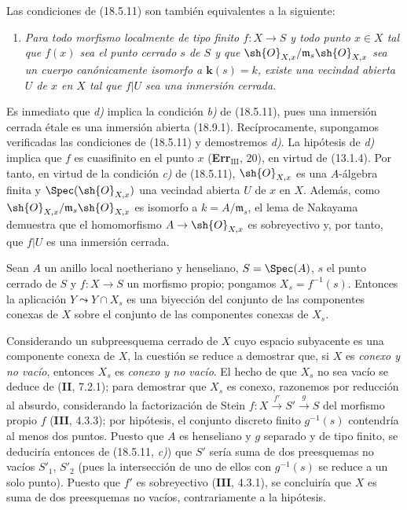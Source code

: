 \begin{remark}[18.5.18]
\label{IV.18.5.18}
Las condiciones de (18.5.11) son también equivalentes a la siguiente:
\begin{enumerate}
  \item[\textup{d)}] \itshape Para todo morfismo localmente de tipo finito $f:X\to S$ y todo punto $x\in X$ tal que $f(x)$ sea el punto cerrado $s$ de $S$ y que $\sh{O}_{X,x}/\mathfrak m_s\sh{O}_{X,x}$ sea un cuerpo canónicamente isomorfo a $\boldsymbol{k}(s)=k$, existe una vecindad abierta $U$ de $x$ en $X$ tal que $f|U$ sea una inmersión cerrada.
\end{enumerate}
\end{remark}


Es inmediato que \emph{d)} implica la condición \emph{b)} de (18.5.11), pues una inmersión cerrada étale es una inmersión abierta (18.9.1). Recíprocamente, supongamos verificadas las condiciones de (18.5.11) y demostremos \emph{d)}. La hipótesis de \emph{d)} implica que $f$ es cuasifinito en el punto $x$ (\textbf{Err}$_{\mathrm{III}}$, 20), en virtud de (13.1.4). Por tanto, en virtud de la condición \emph{c)} de (18.5.11), $\sh{O}_{X,x}$ es una $A$-álgebra finita y $\Spec(\sh{O}_{X,x})$ una vecindad abierta $U$ de $x$ en $X$. Además, como $\sh{O}_{X,x}/\mathfrak m_s\sh{O}_{X,x}$ es isomorfo a $k=A/\mathfrak m_s$, el lema de Nakayama demuestra que el homomorfismo $A\to\sh{O}_{X,x}$ es sobreyectivo y, por tanto, que $f|U$ es una inmersión cerrada.

\begin{proposition}[18.5.19]
\label{IV.18.5.19}
Sean $A$ un anillo local noetheriano y henseliano, $S=\Spec(A)$, $s$ el punto cerrado de $S$ y $f:X\to S$ un morfismo propio; pongamos $X_s=f^{-1}(s)$. Entonces la aplicación $Y\leadsto Y\cap X_s$ es una biyección del conjunto de las componentes conexas de $X$ sobre el conjunto de las componentes conexas de $X_s$.
\end{proposition}

Considerando un subpreesquema cerrado de $X$ cuyo espacio subyacente es una componente conexa de $X$, la cuestión se reduce a demostrar que, si $X$ es \emph{conexo y no vacío}, entonces $X_s$ es \emph{conexo y no vacío}. El hecho de que $X_s$ no sea vacío se deduce de (\textbf{II}, 7.2.1); para demostrar que $X_s$ es conexo, razonemos por reducción al absurdo, considerando la factorización de Stein $f:X\xrightarrow{f'}S'\xrightarrow{g}S$ del morfismo propio $f$ (\textbf{III}, 4.3.3); por hipótesis, el conjunto discreto finito $g^{-1}(s)$ contendría al menos dos puntos. Puesto que $A$ es henseliano y $g$ separado y de tipo finito, se deduciría entonces de (18.5.11, \emph{c)}) que $S'$ sería suma de dos preesquemas no vacíos $S'_1$, $S'_2$ (pues la intersección de uno de ellos con $g^{-1}(s)$ se reduce a un solo punto). Puesto que $f'$ es sobreyectivo (\textbf{III}, 4.3.1), se concluiría que $X$ es suma de dos preesquemas no vacíos, contrariamente a la hipótesis.
